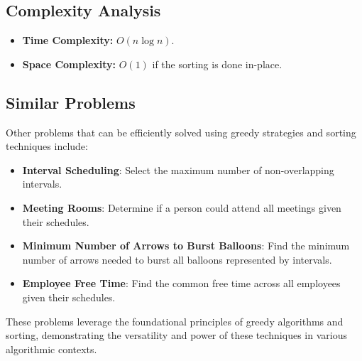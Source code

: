 \subsection*{Complexity Analysis}
\begin{itemize}
    \item \textbf{Time Complexity:} \( O(n \log n) \).
    
    \item \textbf{Space Complexity:} \( O(1) \) if the sorting is done in-place.
\end{itemize}

\subsection*{Similar Problems}
Other problems that can be efficiently solved using greedy strategies and sorting techniques include:
\begin{itemize}
    \item \textbf{Interval Scheduling}: Select the maximum number of non-overlapping intervals.
    
    \item \textbf{Meeting Rooms}: Determine if a person could attend all meetings given their schedules.
    
    \item \textbf{Minimum Number of Arrows to Burst Balloons}: Find the minimum number of arrows needed to burst all balloons represented by intervals.
    
    \item \textbf{Employee Free Time}: Find the common free time across all employees given their schedules.
\end{itemize}
These problems leverage the foundational principles of greedy algorithms and sorting, demonstrating the versatility and power of these techniques in various algorithmic contexts.

